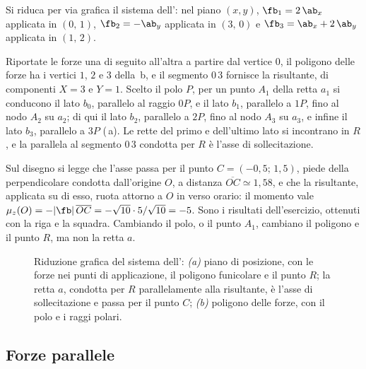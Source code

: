 \begin{esempio}
	\label{ese:riduzione_sgr}
	Si riduca per via grafica il sistema dell': nel piano $(x, y)$,
	$\fb_1 = 2\,\ab_x$ applicata in $(0,\,1)$, $\fb_2 = -\ab_y$ applicata in $(3,\,0)$ e
	$\fb_3 = \ab_x + 2\,\ab_y$ applicata in $(1,\,2)$.

	\begin{svolgimento}
		Riportate le forze una di seguito all'altra a partire dal vertice $0$, il poligono delle forze
		ha i vertici $1$, $2$ e $3$ della \,b, e il segmento $0\,3$ fornisce la
		risultante, di componenti $X = 3$ e $Y = 1$. Scelto il polo $P$, per un punto $A_1$ della retta
		$a_1$ si conducono il lato $b_0$, parallelo al raggio $0P$, e il lato $b_1$, parallelo a $1P$,
		fino al nodo $A_2$ su $a_2$; di qui il lato $b_2$, parallelo a $2P$, fino al nodo $A_3$ su
		$a_3$, e infine il lato $b_3$, parallelo a $3P$ (\,a). Le rette del
		primo e dell'ultimo lato si incontrano in $R$, e la parallela al segmento $0\,3$ condotta per
		$R$ è l'asse di sollecitazione.

		Sul disegno si legge che l'asse passa per il punto $C = (-0{,}5;\,1{,}5)$, piede della
		perpendicolare condotta dall'origine $O$, a distanza $\overline{OC} \simeq 1{,}58$, e che la
		risultante, applicata su di esso, ruota attorno a $O$ in verso orario: il momento vale
		$\mu_z(O) = -|\fb|\,\overline{OC} = -\sqrt{10}\cdot 5/\sqrt{10} = -5$. Sono i risultati
		dell'esercizio, ottenuti con la riga e la squadra. Cambiando il polo, o il punto $A_1$, cambiano
		il poligono e il punto $R$, ma non la retta $a$.
	\end{svolgimento}
\end{esempio}

\begin{figure}[htbp]
	\centering
	\caption{Riduzione grafica del sistema dell': \emph{(a)} piano
		di posizione, con le forze nei punti di applicazione, il poligono funicolare e il punto $R$; la
		retta $a$, condotta per $R$ parallelamente alla risultante, è l'asse di sollecitazione e passa
		per il punto $C$; \emph{(b)} poligono delle forze, con il polo e i raggi polari.}
	\label{fig:esempio_sgr}
\end{figure}

\subsection{Forze parallele}
\label{sec:parallele_sgr}

